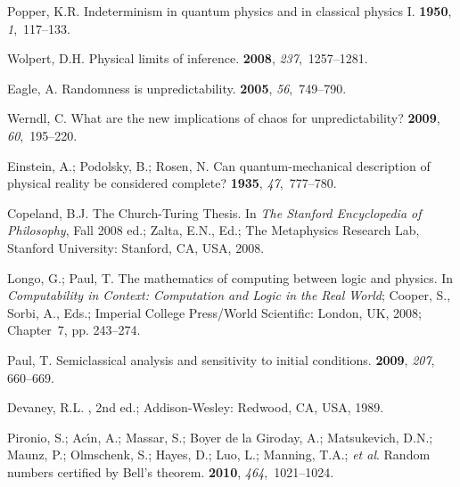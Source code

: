 \documentclass[information,article,accept,moreauthors,pdftex,12pt,a4paper]{mdpi}
\theoremstyle{mdpi}
\newcounter{ex}
\newcounter{re}
\theoremstyle{mdpidefinition}
\begin{document}
\begin{thebibliography}{----}
Popper, K.R.
\newblock Indeterminism in quantum physics and in classical physics {I}.
 {\bf 1950},
 {\em 1},~117--133.

Wolpert, D.H.
\newblock Physical limits of inference.
 {\bf 2008}, {\em 237},~1257--1281.

Eagle, A.
\newblock Randomness is unpredictability.
 {\bf 2005}, {\em
 56},~749--790.

Werndl, C.
\newblock What are the new implications of chaos for unpredictability?
 {\bf 2009}, {\em
 60},~195--220.

Einstein, A.; Podolsky, B.; Rosen, N.
\newblock Can quantum-mechanical description of physical reality be considered
 complete?
 {\bf 1935}, {\em 47},~777--780.


\newpage

Copeland, B.J.
\newblock The Church-Turing Thesis. In {\em The Stanford Encyclopedia of Philosophy}, Fall 2008 ed.; Zalta, E.N., Ed.; The Metaphysics Research Lab, Stanford University: Stanford, CA, USA, 2008.


Longo, G.; Paul, T.
\newblock The mathematics of computing between logic and physics. In {\em
 Computability in Context: Computation and Logic in the Real World}; Cooper, S., Sorbi, A., Eds.; Imperial College Press/World Scientific: London, UK, 2008; Chapter~7, pp.
 243--274.

Paul, T.
\newblock Semiclassical analysis and sensitivity to initial conditions.
 {\bf 2009}, {\em 207}, \mbox{660--669.}

Devaney, R.L.
, 2nd ed.;
 Addison-Wesley: Redwood, CA, USA, 1989.

Pironio, S.; Ac{\'\i}n, A.; Massar, S.; {Boyer de la Giroday}, A.; Matsukevich,
 D.N.; Maunz, P.; Olmschenk, S.; Hayes, D.; Luo, L.; Manning, T.A.; \emph{et al}.
\newblock Random numbers certified by {B}ell's theorem.
 {\bf 2010}, {\em 464},~1021--1024.


\end{thebibliography}
\end{document}
